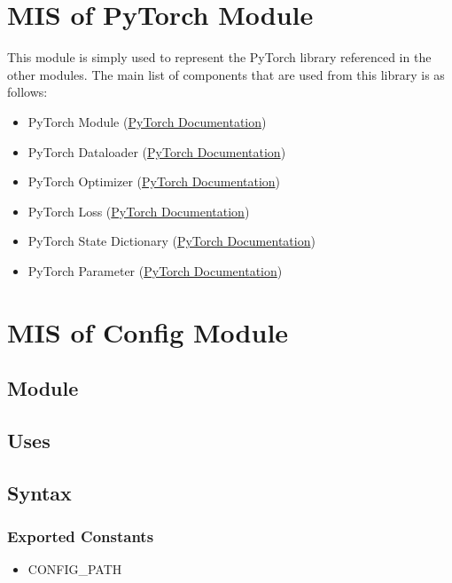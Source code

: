 \documentclass[12pt, titlepage]{article}
\begin{document}
\section{MIS of PyTorch Module} \label{Module} 
This module is simply used to represent the PyTorch library referenced in the other modules.
The main list of components that are used from this library is as follows:
\begin{itemize}
  \item PyTorch Module (\href{https://pytorch.org/docs/stable/generated/torch.nn.Module.html}{PyTorch Documentation})
  \item PyTorch Dataloader (\href{https://pytorch.org/tutorials/beginner/basics/data_tutorial.html}{PyTorch Documentation})
  \item PyTorch Optimizer (\href{https://pytorch.org/docs/stable/optim.html}{PyTorch Documentation})
  \item PyTorch Loss (\href{https://pytorch.org/docs/stable/nn.html#loss-functions}{PyTorch Documentation})
  \item PyTorch State Dictionary (\href{https://pytorch.org/tutorials/beginner/saving_loading_models.html}{PyTorch Documentation})
  \item PyTorch Parameter (\href{https://pytorch.org/docs/stable/generated/torch.nn.parameter.Parameter.html}{PyTorch Documentation})
\end{itemize}

\newpage

\section{MIS of Config Module} \label{Module} 

\subsection{Module}



\subsection{Uses}


\subsection{Syntax}



\subsubsection{Exported Constants}
\begin{itemize}
  \item CONFIG\_PATH
\end{itemize}
\end{document}
